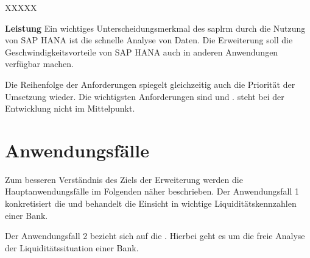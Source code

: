 \begin{onehalfspacing}
\begin{seToplist}{ XXXXX }
\item[\anfl{leistung}] \textbf{Leistung} \newline
Ein wichtiges Unterscheidungsmerkmal des \gls{saplrm} durch die Nutzung von SAP HANA ist die schnelle Analyse von Daten. Die Erweiterung soll die Geschwindigkeitsvorteile von SAP HANA auch in anderen Anwendungen verfügbar machen.

\end{seToplist}

Die Reihenfolge der Anforderungen spiegelt gleichzeitig auch die Priorität der Umsetzung wieder. Die wichtigsten Anforderungen sind  und .  steht bei der Entwicklung nicht im Mittelpunkt.

\section{Anwendungsfälle}
Zum besseren Verständnis des Ziels der Erweiterung werden die Hauptanwendungsfälle im Folgenden näher beschrieben. Der Anwendungsfall 1 konkretisiert die  und behandelt die Einsicht in wichtige Liquiditätskennzahlen einer Bank.


Der Anwendungsfall 2 bezieht sich auf die . Hierbei geht es um die freie Analyse der Liquiditätssituation einer Bank.

\end{onehalfspacing}

